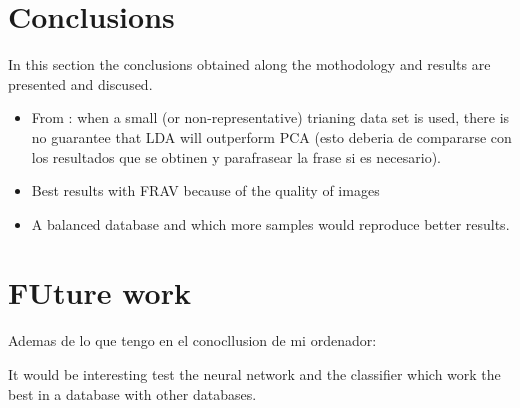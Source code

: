 \section{Conclusions}
In this section the conclusions obtained along the mothodology and results are presented and discused.

\begin{itemize}
\item From \cite{PCAvsLDA}: when a small (or non-representative) trianing data set is used, there is no guarantee that LDA will outperform PCA (esto deberia de compararse con los resultados que se obtinen y parafrasear la frase si es necesario).
\item Best results with FRAV because of the quality of images
\item A balanced database and which more samples would reproduce better results.
\end{itemize}

\section{FUture work}

Ademas de lo que tengo en el conocllusion de mi ordenador:

It would be interesting test the neural network and the classifier which work the best in a database with other databases. \\